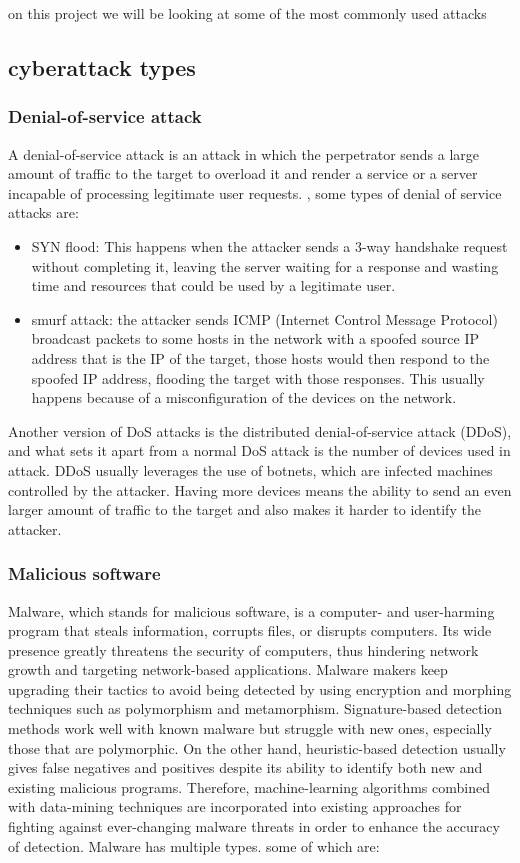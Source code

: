 on this project we will be looking at some of the most commonly used attacks


\subsection{cyberattack types}
\subsubsection{Denial-of-service attack}
A denial-of-service attack is an attack in which the perpetrator sends a large amount of traffic to the target to overload it and render a service or a server incapable of processing legitimate user requests. \cite{dos}, some types of denial of service attacks are:
\begin{itemize}
	\item SYN flood: This happens when the attacker sends a 3-way handshake request without completing it, leaving the server waiting for a response and wasting time and resources that could be used by a legitimate user. \cite{dos}
	\item smurf attack: the attacker sends ICMP (Internet Control Message Protocol) broadcast packets to some hosts in the network with a spoofed source IP address that is the IP of the target, those hosts would then respond to the spoofed IP address, flooding the target with those responses. This usually happens because of a misconfiguration of the devices on the network. \cite{dos}
\end{itemize}

Another version of DoS attacks is the distributed denial-of-service attack (DDoS), and what sets it apart from a normal DoS attack is the number of devices used in attack. DDoS usually leverages the use of botnets, which are infected machines controlled by the attacker. Having more devices means the ability to send an even larger amount of traffic to the target and also makes it harder to identify the attacker. \cite{dos}
	

\subsubsection{Malicious software}
Malware, which stands for malicious software, is a computer- and user-harming program that steals information, corrupts files, or disrupts computers. Its wide presence greatly threatens the security of computers, thus hindering network growth and targeting network-based applications. Malware makers keep upgrading their tactics to avoid being detected by using encryption and morphing techniques such as polymorphism and metamorphism. Signature-based detection methods work well with known malware but struggle with new ones, especially those that are polymorphic. On the other hand, heuristic-based detection usually gives false negatives and positives despite its ability to identify both new and existing malicious programs. Therefore, machine-learning algorithms combined with data-mining techniques are incorporated into existing approaches for fighting against ever-changing malware threats in order to enhance the accuracy of detection. \cite{malware} Malware has multiple types. some of which are:

